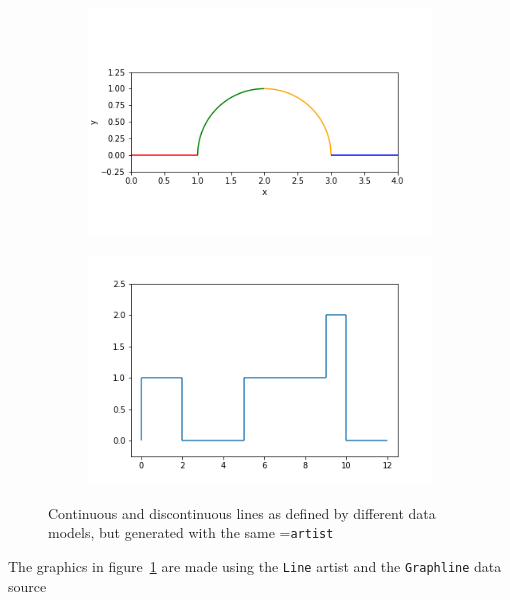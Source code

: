 \documentclass[../main.tex]{subfiles}
\begin{document}
\begin{figure}[H]
    \begin{subfigure}{0.5\textwidth}
        \includegraphics[width=\textwidth]{figures/code/linec_1.png}
    \end{subfigure}
    \begin{subfigure}{0.5\textwidth}
        \includegraphics[width=\textwidth]{figures/code/lined_1.png}
    \end{subfigure}
    \caption{Continuous and discontinuous lines as defined by different data models, but generated with the same \vartisteq=\texttt{artist}}
    \label{fig:circle_step}
\end{figure}

The graphics in figure~\ref{fig:circle_step} are made using the \texttt{Line} artist and the \texttt{Graphline} data source
\end{document}
